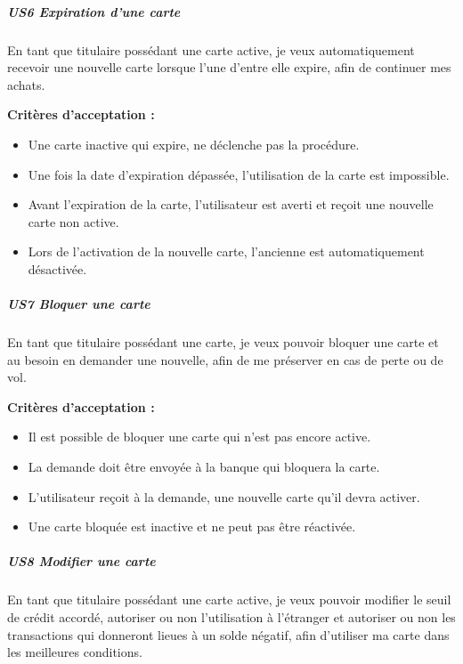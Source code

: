 \hypertarget{us6-expiration-dune-carte}{%
\subparagraph{US6 Expiration d'une
carte}\label{us6-expiration-dune-carte}}

En tant que titulaire possédant une carte active, je veux
automatiquement recevoir une nouvelle carte lorsque l'une d'entre elle
expire, afin de continuer mes achats.

\textbf{Critères d'acceptation :}

\begin{itemize}
\tightlist
\item
  Une carte inactive qui expire, ne déclenche pas la procédure.
\item
  Une fois la date d'expiration dépassée, l'utilisation de la carte est
  impossible.
\item
  Avant l'expiration de la carte, l'utilisateur est averti et reçoit une
  nouvelle carte non active.
\item
  Lors de l'activation de la nouvelle carte, l'ancienne est
  automatiquement désactivée.
\end{itemize}

\hypertarget{us7-bloquer-une-carte}{%
\subparagraph{US7 Bloquer une carte}\label{us7-bloquer-une-carte}}

En tant que titulaire possédant une carte, je veux pouvoir bloquer une
carte et au besoin en demander une nouvelle, afin de me préserver en cas
de perte ou de vol.

\textbf{Critères d'acceptation :}

\begin{itemize}
\tightlist
\item
  Il est possible de bloquer une carte qui n'est pas encore active.
\item
  La demande doit être envoyée à la banque qui bloquera la carte.
\item
  L'utilisateur reçoit à la demande, une nouvelle carte qu'il devra
  activer.
\item
  Une carte bloquée est inactive et ne peut pas être réactivée.
\end{itemize}

\hypertarget{us8-modifier-une-carte}{%
\subparagraph{US8 Modifier une carte}\label{us8-modifier-une-carte}}

En tant que titulaire possédant une carte active, je veux pouvoir
modifier le seuil de crédit accordé, autoriser ou non l'utilisation à
l'étranger et autoriser ou non les transactions qui donneront lieues à
un solde négatif, afin d'utiliser ma carte dans les meilleures
conditions.

